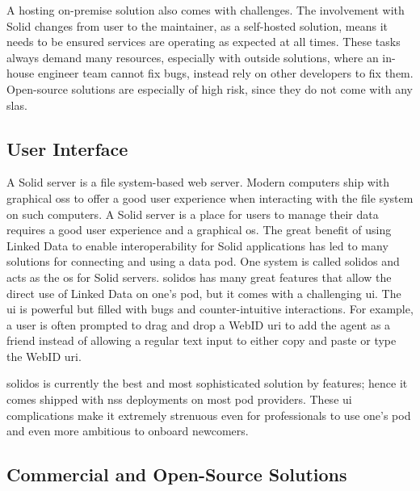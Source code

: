 A hosting on-premise solution also comes with challenges. The involvement with Solid changes from user to the maintainer, as a self-hosted solution, means it needs to be ensured services are operating as expected at all times. These tasks always demand many resources, especially with outside solutions, where an in-house engineer team cannot fix bugs, instead rely on other developers to fix them. Open-source solutions are especially of high risk, since they do not come with any \glspl{sla}.

\subsection{User Interface}

A Solid server is a file system-based web server. Modern computers ship with graphical \glspl{os} to offer a good user experience when interacting with the file system on such computers. A Solid server is a place for users to manage their data requires a good user experience and a graphical \gls{os}. The great benefit of using Linked Data to enable interoperability for Solid applications has led to many solutions for connecting and using a data pod. One system is called \gls{solidos} \cite{solidos} and acts as the \gls{os} for Solid servers. \gls{solidos} has many great features that allow the direct use of Linked Data on one's pod, but it comes with a challenging \gls{ui}. The \gls{ui} is powerful but filled with bugs and counter-intuitive interactions. For example, a user is often prompted to drag and drop a WebID \gls{uri} to add the agent as a friend instead of allowing a regular text input to either copy and paste or type the WebID \gls{uri}.

\gls{solidos} is currently the best and most sophisticated solution by features; hence it comes shipped with \gls{nss} deployments on most pod providers. These \gls{ui} complications make it extremely strenuous even for professionals to use one's pod and even more ambitious to onboard newcomers.

\subsection{Commercial and Open-Source Solutions}

